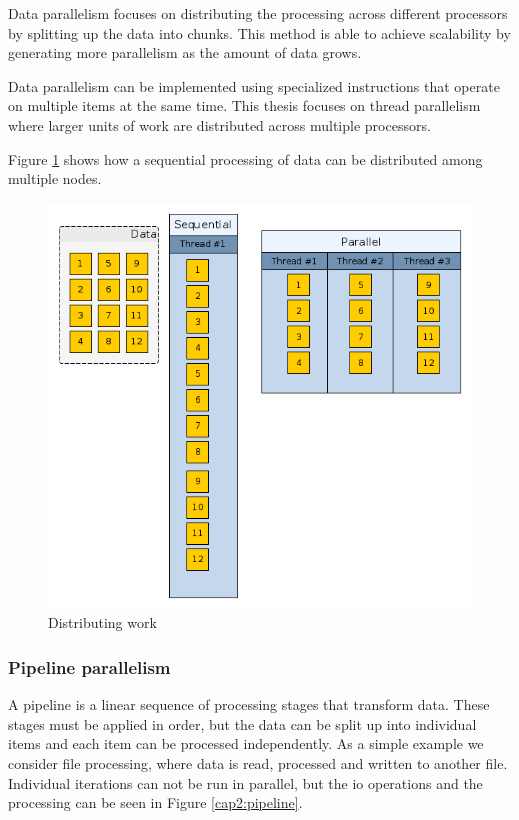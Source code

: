 Data parallelism \cite{parbook} focuses on distributing the processing across different processors by splitting up the data into chunks. This method is able to achieve scalability by generating more parallelism as the amount of data grows.

Data parallelism can be implemented using specialized instructions that operate on multiple items at the same time. This thesis focuses on thread parallelism where larger units of work are distributed across multiple processors.

Figure \ref{cap2:datapar} shows how a sequential processing of data can be distributed among multiple nodes.

\begin{figure}
	\centering
	\includegraphics[width=1\textwidth]{seqtopar}
	\caption{Distributing work}
	\label{cap2:datapar}
\end{figure}

\subsubsection{Pipeline parallelism}

A pipeline \cite{parbook} is a linear sequence of processing stages that transform data. These stages must be applied in order, but the data can be split up into individual items and each item can be processed independently. As a simple example we consider file processing, where data is read, processed and written to another file. Individual iterations can not be run in parallel, but the io operations and the processing can be seen in Figure \ref{cap2:pipeline}.

